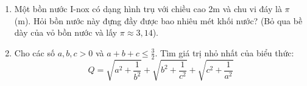 \begin{ex}
	\begin{enumerate}
		\item[a)] Một bồn nước I-nox có dạng hình trụ với chiều cao 2m và chu vi đáy là $\pi$ (m). Hỏi bồn nước này đựng đầy được bao nhiêu mét khối nước? (Bỏ qua bề dày của vỏ bồn nước và lấy $\pi \approx 3,14$).
		\item[b)] Cho các số $a, b, c > 0$ và $a+b+c \le \frac{3}{2}$. Tìm giá trị nhỏ nhất của biểu thức:
		$$ Q = \sqrt{a^2+\frac{1}{b^2}} + \sqrt{b^2+\frac{1}{c^2}} + \sqrt{c^2+\frac{1}{a^2}} $$
	\end{enumerate}
\end{ex}

